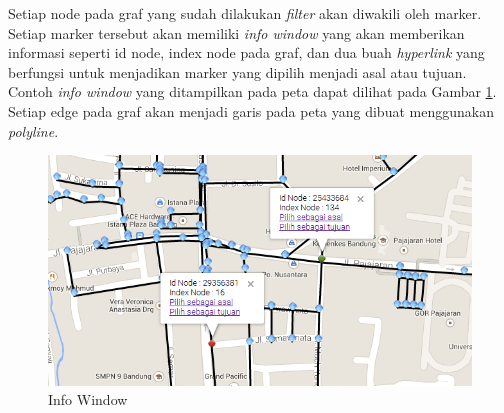 Setiap node pada graf yang sudah dilakukan \textit{filter}
akan diwakili oleh marker. Setiap marker tersebut akan memiliki \textit{info
window} yang akan memberikan informasi seperti id node, index node pada graf,
dan dua buah \textit{hyperlink} yang berfungsi untuk menjadikan marker yang
dipilih menjadi asal atau tujuan. Contoh \textit{info window} yang ditampilkan
pada peta dapat dilihat pada Gambar \ref{fig:visualisasi_infowindow}. Setiap
edge pada graf akan menjadi garis pada peta yang dibuat menggunakan \textit{polyline}.
\begin{figure}[h]
\centering
\includegraphics[scale=0.8]{Gambar/visualisasi_infowindow}
\caption[Info Window]{Info Window}
\label{fig:visualisasi_infowindow}
\end{figure}

